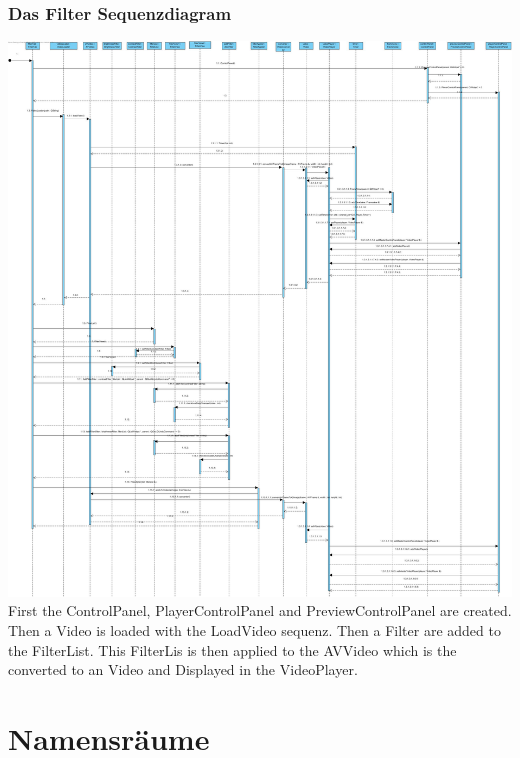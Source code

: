 \documentclass[twoside]{book}
\newcommand{\+}{\discretionary{\mbox{\scriptsize$\hookleftarrow$}}{}{}}
\begin{document}
\subsection*{Das Filter Sequenzdiagram}
{\centering\includegraphics[width=1\textwidth]{SequenceDiagram3.jpg}}\\
First the ControlPanel, PlayerControlPanel and PreviewControlPanel are created.
Then a Video is loaded with the LoadVideo sequenz. Then a Filter are added to the FilterList. This FilterLis is then applied to the AVVideo which is the converted to an Video and Displayed in the VideoPlayer.
\chapter{Namensräume}








\end{document}
